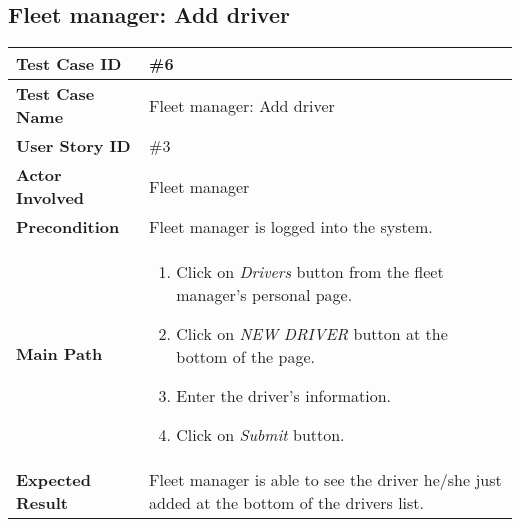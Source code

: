 \subsection{Fleet manager: Add driver}
\begin{center}
	\begin{tabular} { | m{3.5cm} | m{9.5cm} | }
		\hline
		\textbf{Test Case ID} & \#6\\
		\hline
		\textbf{Test Case Name} & Fleet manager: Add driver\\
		\hline
		\textbf{User Story ID} & \#3 \\
		\hline
		\textbf{Actor Involved} & Fleet manager\\
		\hline
		\textbf{Precondition} & Fleet manager is logged into the system.\\
		\hline
		\textbf{Main Path} & 
		\begin{enumerate}
			\item Click on \textit{Drivers} button from the fleet manager's personal page.
			\item Click on \textit{NEW DRIVER} button at the bottom of the page.
			\item Enter the driver's information.
			\item Click on \textit{Submit} button.
		\end{enumerate}\\
		\hline
		\textbf{Expected Result} & Fleet manager is able to see the driver he/she just added at the bottom of the drivers list.\\
		\hline
	\end{tabular}
\end{center}

